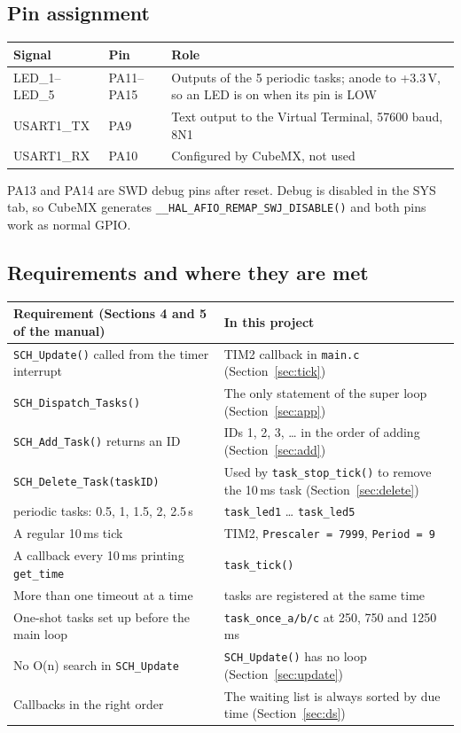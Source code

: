 \documentclass[12pt,a4paper]{article}
\numberwithin{figure}{section}
\numberwithin{table}{section}
\newcommand{\code}[1]{\texttt{#1}}
\begin{document}
\subsection{Pin assignment}
\begin{center}
\begin{tabularx}{\linewidth}{>{\ttfamily}l l X}
\toprule
\normalfont\textbf{Signal} & \textbf{Pin} & \textbf{Role}\\
\midrule
LED\_1{\normalfont--}LED\_5 & PA11--PA15 & Outputs of the 5 periodic tasks; anode to +3.3\,V, so an LED is on when its pin is LOW\\
USART1\_TX & PA9 & Text output to the Virtual Terminal, 57600 baud, 8N1\\
USART1\_RX & PA10 & Configured by CubeMX, not used\\
\bottomrule
\end{tabularx}
\end{center}
PA13 and PA14 are SWD debug pins after reset. Debug is disabled in the SYS tab, so CubeMX generates \code{\_\_HAL\_AFIO\_REMAP\_SWJ\_DISABLE()} and both pins work as normal GPIO.

\subsection{Requirements and where they are met}
\begin{center}
\begin{tabularx}{\linewidth}{>{\raggedright\arraybackslash}X >{\raggedright\arraybackslash}X}
\toprule
\textbf{Requirement (Sections 4 and 5 of the manual)} & \textbf{In this project}\\
\midrule
\code{SCH\_Update()} called from the timer interrupt & TIM2 callback in \code{main.c} (Section~\ref{sec:tick})\\
\code{SCH\_Dispatch\_Tasks()} & The only statement of the super loop (Section~\ref{sec:app})\\
\code{SCH\_Add\_Task()} returns an ID & IDs 1, 2, 3, \ldots{} in the order of adding (Section~\ref{sec:add})\\
\code{SCH\_Delete\_Task(taskID)} & Used by \code{task\_stop\_tick()} to remove the 10\,ms task (Section~\ref{sec:delete})\\
5 periodic tasks: 0.5, 1, 1.5, 2, 2.5\,s & \code{task\_led1} \ldots{} \code{task\_led5}\\
A regular 10\,ms tick & TIM2, \code{Prescaler = 7999}, \code{Period = 9}\\
A callback every 10\,ms printing \code{get\_time} & \code{task\_tick()}\\
More than one timeout at a time & 10 tasks are registered at the same time\\
One-shot tasks set up before the main loop & \code{task\_once\_a/b/c} at 250, 750 and 1250\,ms\\
No O(n) search in \code{SCH\_Update} & \code{SCH\_Update()} has no loop (Section~\ref{sec:update})\\
Callbacks in the right order & The waiting list is always sorted by due time (Section~\ref{sec:ds})\\
\bottomrule
\end{tabularx}
\end{center}
\end{document}
